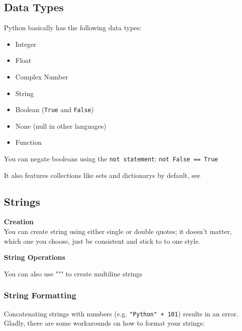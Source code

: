 
    \subsection{Data Types}
        Python basically has the following data types:
        \begin{itemize}
            \item Integer
            \item Float
            \item Complex Number
            \item String
            \item Boolean (\texttt{True} and \texttt{False})
            \item None (null in other languages)
            \item Function
        \end{itemize}

        You can negate booleans using the \texttt{not statement}:
        \texttt{not False == True}

        It also features collections like sets and dictionarys by default, see 

    \subsection{Strings}

        \begin{indentblock}

            \textbf{Creation} \\
            You can create string using either single or double quotes;
            it doesn't matter, which one you choose, just be consistent and
            stick to to one style.

            \textbf{String Operations} \\

        \end{indentblock}

        You can also use """ to create multiline strings

        \subsubsection{String Formatting}
            Concatenating strings with numbers (e.g. \texttt{"Python" + 101}) results
            in an error. \\
            Gladly, there are some workarounds on how to format your strings:


